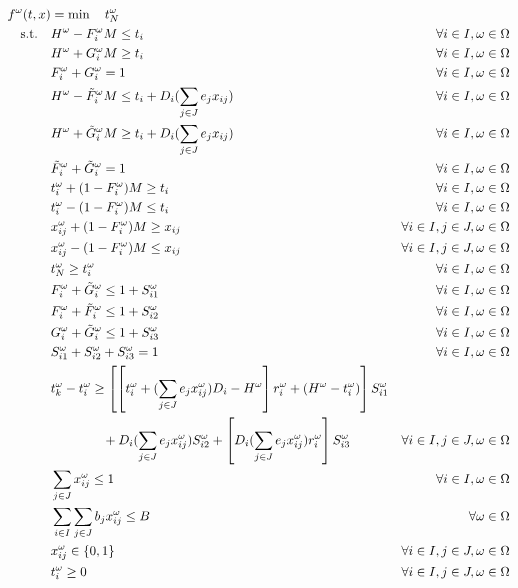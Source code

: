 \documentclass[11pt]{article}
\begin{document}
		\begin{align}
			f^\omega(t,x)& = \min \quad t_N^\omega &\\
			\text{s.t.} \quad & H^\omega - F_i^\omega M \leq t_i & \forall i \in I, \omega \in \Omega\\
			& H^\omega + G_i^\omega M \geq t_i & \forall i \in I, \omega \in \Omega\\
			& F_i^\omega + G_i^\omega = 1 & \forall i \in I, \omega \in \Omega \\
			& H^\omega - \tilde{F}_i^\omega M \leq t_i + D_i(\sum_{j \in J}e_jx_{ij}) & \forall i \in I, \omega \in \Omega\\
			& H^\omega + \tilde{G}_i^\omega M \geq t_i + D_i(\sum_{j \in J}e_jx_{ij}) & \forall i \in I, \omega \in \Omega\\
			& \tilde{F}_i^\omega + \tilde{G}_i^\omega = 1 & \forall i \in I, \omega \in \Omega \\
			& t_i^\omega + (1 - F_i^\omega)M \geq t_i & \forall i \in I, \omega \in \Omega\\
			& t_i^\omega - (1 - F_i^\omega)M \leq t_i & \forall i \in I, \omega \in \Omega\\
			& x_{ij}^\omega + (1 - F_i^\omega)M \geq x_{ij} & \forall i \in I, j \in J, \omega \in \Omega \\
			& x_{ij}^\omega - (1 - F_i^\omega)M \leq x_{ij} & \forall i \in I, j \in J, \omega \in \Omega \\
			& t_N^\omega \geq t_i^\omega & \forall i \in I, \omega \in \Omega\\
			& F_i^\omega + \tilde{G}_i^\omega \leq 1 + S_{i1}^\omega & \forall i \in I, \omega \in \Omega \\
			& F_i^\omega + \tilde{F}_i^\omega \leq 1 + S_{i2}^\omega & \forall i \in I, \omega \in \Omega \\
			& G_i^\omega + \tilde{G}_i^\omega \leq 1 + S_{i3}^\omega & \forall i \in I, \omega \in \Omega \\
			& S_{i1}^\omega + S_{i2}^\omega + S_{i3}^\omega = 1 & \forall i \in I, \omega \in \Omega \\
			& t_k^\omega - t_i^\omega \geq \left[\left[t_i^\omega + (\sum_{j \in J} e_jx_{ij}^\omega)D_i - H^\omega\right] r_i^\omega +(H^\omega - t_i^\omega) \right]S_{i1}^\omega & \notag \\&\qquad \qquad + D_i(\sum_{j \in J} e_jx_{ij}^\omega)S_{i2}^\omega + \left[D_i (\sum_{j \in J} e_j x_{ij}^\omega) r_i^\omega \right] S_{i3}^\omega & \forall i \in I, j \in J, \omega \in \Omega\\
			& \sum_{j \in J} x_{ij}^\omega \leq 1 & \forall i \in I, \omega \in \Omega\\
			& \sum_{i \in I}\sum_{j \in J} b_jx_{ij}^\omega \leq B & \forall \omega \in \Omega\\
			& x_{ij}^\omega \in \{0,1\} & \forall i \in I, j \in J, \omega \in \Omega\\
			& t_{i}^\omega \geq 0 & \forall i \in I, j \in J, \omega \in \Omega
		\end{align}
\end{document}
